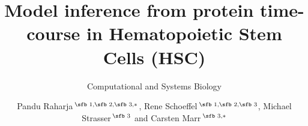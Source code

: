 \documentclass{bioinfo}
\begin{document}

\subtitle{Computational and Systems Biology}

\title[Model inference from protein time-courses in Hematopoietic Stem Cells (HSC)]{Model inference from protein time-course in Hematopoietic Stem Cells (HSC)}
\author[Pandu Raharja, Rene Schoeffel, Michael Strasser and Carsten Marr]{Pandu Raharja\,$^{\text{\sfb 1,}\text{\sfb 2,}\text{\sfb 3,}*}$, Rene Schoeffel\,$^{\text{\sfb 1,}\text{\sfb 2,}\text{\sfb 3}}$, Michael Strasser\,$^{\text{\sfb 3}}$ and Carsten Marr\,$^{\text{\sfb 3,}*}$}
\address{$^{\text{\sf 1}}$Technische Universit\"at M\"unchen, Fakult\"at f\"ur Informatik, Boltzmannstr. 3, 85748 Garching bei M\"unchen, Germany\\
$^{\text{\sf 2}}$Ludwig-Maximilians-Universit\"at M\"unchen, Professor-Huber-Platz 2, 80539 M\"unchen, Germany\\
$^{\text{\sf 3}}$Helmholtz Zentrum M\"unchen, Institute of Computational Biology, Ingolst\"adter Landstr. 1
85764 Neuherberg, Germany.}



\end{document}
